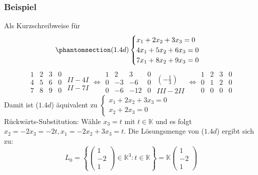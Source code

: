 \subsubsection{Beispiel}
Als Kurzschreibweise für \[\phantomsection\label{1.4d}(1.4d)\begin{cases}x_1+2x_2+3x_3=0\\ 4x_1+5x_2+6x_3=0\\ 7x_1+8x_2+9x_3=0\end{cases}\]
\[\begin{array}{ccc|c}1 & 2 & 3 & 0\\ 4 & 5 & 6 & 0\\ 7 & 8 & 9 & 0\end{array} \begin{array}{c} \\ II - 4I\\ II-7I\end{array} \Leftrightarrow \begin{array}{ccc|c}1 & 2 & 3 & 0\\ 0 & -3 & -6 & 0\\ 0 & -6 & -12 & 0\end{array} \begin{array}{c} \\ (-\frac{1}{3})\\ III-2II\end{array} \Leftrightarrow \begin{array}{ccc|c}1 & 2 & 3 & 0\\ 0 & 1 & 2 & 0\\ 0 & 0 & 0 & 0\end{array}\]
Damit ist (\hyperref[1.4d]{$1.4d$}) äquivalent zu $\begin{cases}x_1+2x_2+3x_3=0\\ x_2+2x_3=0\end{cases}$\\
Rückwärts-Substitution: Wähle $x_3=t$ mit $t\in\mathbb{K}$ und es folgt $x_2=-2x_3=-2t,x_1=-2x_2+3x_3=t$.  Die Lösungsmenge von (\hyperref[1.4d]{$1.4d$}) ergibt sich zu:
\[ L_0=\left\{\left(\begin{array}{c}1\\ -2\\ 1\end{array}\right) \in \mathbb{K}^3:t\in\mathbb{K}\right\} = \mathbb{K}\left(\begin{array}{c}1\\ -2\\ 1\end{array}\right)\]
